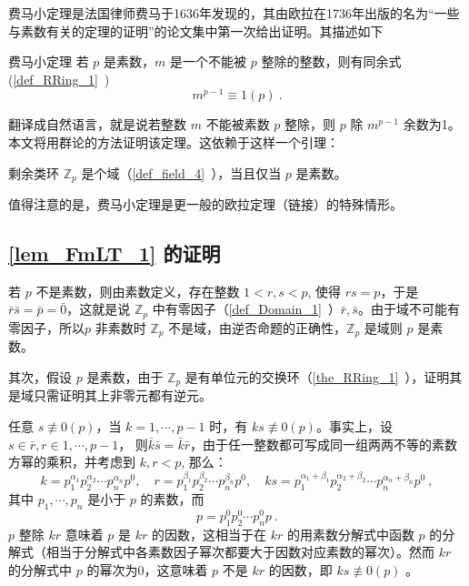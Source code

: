 费马小定理是法国律师费马于1636年发现的，其由欧拉在1736年出版的名为“一些与素数有关的定理的证明”的论文集中第一次给出证明。其描述如下
\begin{theorem}{费马小定理}\label{the_FmLT_1}
若 $p$ 是素数，$m$ 是一个不能被 $p$ 整除的整数，则有同余式(\autoref{def_RRing_1}~)
\begin{equation}\label{eq_FmLT_3}
m^{p-1}\equiv 1(p)~.
\end{equation}
\end{theorem}
翻译成自然语言，就是说若整数 $m$ 不能被素数 $p$ 整除，则 $p$ 除 $m^{p-1}$ 余数为1。本文将用群论的方法证明该定理。这依赖于这样一个引理：
\begin{lemma}{}\label{lem_FmLT_1}
剩余类环 $\mathbb Z_p$ 是个域（\autoref{def_field_4}~），当且仅当 $p$ 是素数。
\end{lemma}

值得注意的是，费马小定理是更一般的欧拉定理（链接）的特殊情形。
\subsection{\autoref{lem_FmLT_1} 的证明}\label{sub_FmLT_1}
若 $p$ 不是素数，则由素数定义，存在整数 $1<r,s<p$, 使得 $rs=p$，于是 $\bar r\bar s=\bar p=\bar 0$，这就是说 $\mathbb Z_p$ 中有零因子（\autoref{def_Domain_1}~）$\bar r,\bar s$。由于域不可能有零因子，所以$p$ 非素数时 $\mathbb Z_p$ 不是域，由逆否命题的正确性，$\mathbb Z_p$ 是域则 $p$ 是素数。

其次，假设 $p$ 是素数，由于 $\mathbb Z_p$ 是有单位元的交换环（\autoref{the_RRing_1}~），证明其是域只需证明其上非零元都有逆元。

任意 $s\not\equiv 0(p)$，当 $k=1,\cdots,p-1$ 时，有 $ks\not\equiv 0(p)$。事实上，设 $s\in\bar r, r\in{1,\cdots,p-1}$， 则$\bar k\bar s=\bar k\bar r$，由于任一整数都可写成同一组两两不等的素数方幂的乘积，并考虑到 $k,r<p$, 那么：
\begin{equation}
k=p_1^{\alpha_1}p_2^{\alpha_2}\cdots p_n^{\alpha_n}p^0, \quad r=p_1^{\beta_1}p_2^{\beta_2}\cdots p_n^{\beta_n}p^0,\quad ks=p_1^{\alpha_1+\beta_1}p_2^{\alpha_2+\beta_2}\cdots p_n^{\alpha_n+\beta_n}p^0~,
\end{equation}
其中 $p_1,\cdots,p_n$ 是小于 $p$ 的素数，而
\begin{equation}
p=p_1^0p_2^0\cdots p_n^{0}p~.
\end{equation}
$p$ 整除 $kr$ 意味着 $p$ 是 $kr$ 的因数，这相当于在 $kr$ 的用素数分解式中函数 $p$ 的分解式（相当于分解式中各素数因子幂次都要大于因数对应素数的幂次）。然而 $kr$ 的分解式中 $p$ 的幂次为0，这意味着 $p$ 不是 $kr$ 的因数，即 $ks\not\equiv 0(p)$ 。

